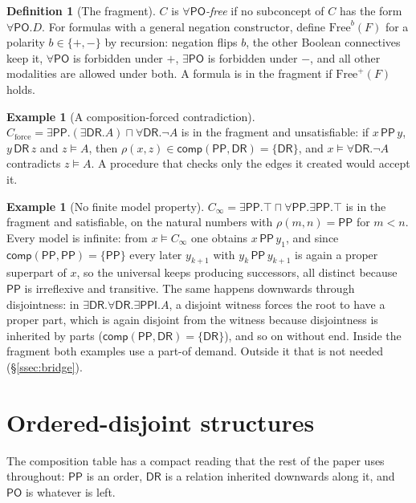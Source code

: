 \documentclass[11pt]{article}
\newcommand{\DR}{\mathsf{DR}}
\newcommand{\PO}{\mathsf{PO}}
\newcommand{\PP}{\mathsf{PP}}
\newcommand{\PPI}{\mathsf{PPI}}
\newcommand{\comp}{\mathsf{comp}}
\theoremstyle{plain}
\theoremstyle{definition}
\newtheorem{definition}[theorem]{Definition}
\newtheorem{example}[theorem]{Example}
\begin{document}
\begin{definition}[The fragment]
$C$ is \emph{$\forall\PO$-free} if no subconcept of $C$ has the form
$\forall\PO.D$. For formulas with a general negation constructor, define
$\mathrm{Free}^{b}(F)$ for a polarity $b\in\{+,-\}$ by recursion: negation flips
$b$, the other Boolean connectives keep it, $\forall\PO$ is forbidden under
$+$, $\exists\PO$ is forbidden under $-$, and all other modalities are allowed
under both. A formula is in the fragment if $\mathrm{Free}^{+}(F)$ holds.
\end{definition}

\begin{example}[A composition-forced contradiction]\label{ex:force}
$C_{\mathrm{force}}=\exists\PP.(\exists\DR.A)\sqcap\forall\DR.\neg A$ is in the
fragment and unsatisfiable: if $x\,\PP\,y$, $y\,\DR\,z$ and $z\models A$, then
$\rho(x,z)\in\comp(\PP,\DR)=\{\DR\}$, and $x\models\forall\DR.\neg A$ contradicts
$z\models A$. A procedure that checks only the edges it created would accept
it.
\end{example}

\begin{example}[No finite model property]\label{ex:inf}
$C_\infty=\exists\PP.\top\sqcap\forall\PP.\exists\PP.\top$ is in the fragment and
satisfiable, on the natural numbers with $\rho(m,n)=\PP$ for $m<n$. Every model is
infinite: from $x\models C_\infty$ one obtains $x\,\PP\,y_1$, and since
$\comp(\PP,\PP)=\{\PP\}$ every later $y_{k+1}$ with $y_k\,\PP\,y_{k+1}$ is again
a proper superpart of $x$, so the universal keeps producing successors, all
distinct because $\PP$ is irreflexive and transitive. The same happens
downwards through disjointness: in $\exists\DR.\forall\DR.\exists\PPI.A$, a
disjoint witness forces the root to have a proper part, which is again
disjoint from the witness because disjointness is inherited by parts
($\comp(\PP,\DR)=\{\DR\}$), and so on without end. Inside the fragment both
examples use a part-of demand. Outside it that is not needed
(\S\ref{ssec:bridge}).
\end{example}

\section{Ordered-disjoint structures}
\label{sec:od}

The composition table has a compact reading that the rest of the paper uses
throughout: $\PP$ is an order, $\DR$ is a relation inherited downwards along it,
and $\PO$ is whatever is left.
\end{document}

